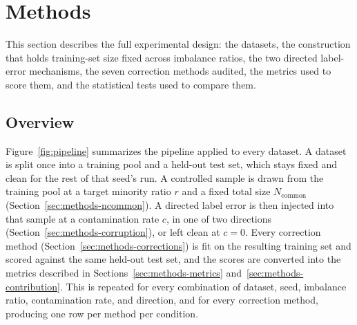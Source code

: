\section{Methods}
\label{sec:methods}

This section describes the full experimental design: the datasets, the
construction that holds training-set size fixed across imbalance ratios, the
two directed label-error mechanisms, the seven correction methods audited, the
metrics used to score them, and the statistical tests used to compare them.

\subsection{Overview}
\label{sec:methods-overview}

Figure~\ref{fig:pipeline} summarizes the pipeline applied to every dataset. A
dataset is split once into a training pool and a held-out test set, which stays
fixed and clean for the rest of that seed's run. A controlled sample is drawn
from the training pool at a target minority ratio $r$ and a fixed total size
$N_{\text{common}}$ (Section~\ref{sec:methods-ncommon}). A directed label error
is then injected into that sample at a contamination rate $c$, in one of two
directions (Section~\ref{sec:methods-corruption}), or left clean at $c{=}0$.
Every correction method (Section~\ref{sec:methods-corrections}) is fit on the
resulting training set and scored against the same held-out test set, and the
scores are converted into the metrics described in
Sections~\ref{sec:methods-metrics} and~\ref{sec:methods-contribution}. This is
repeated for every combination of dataset, seed, imbalance ratio, contamination
rate, and direction, and for every correction method, producing one row per
method per condition.

